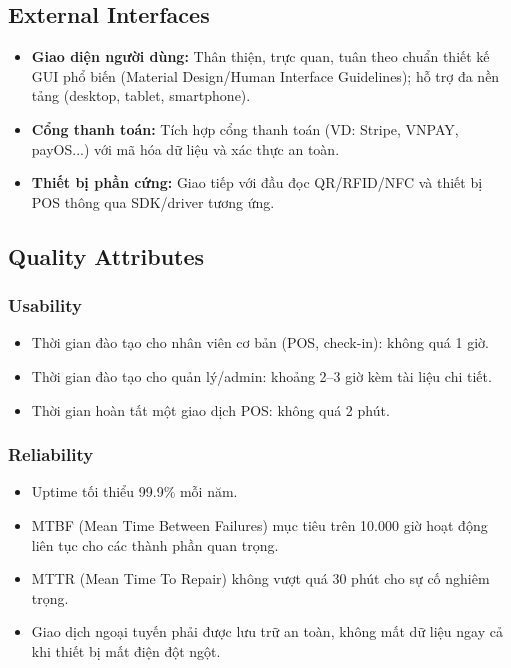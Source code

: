 \subsection{External Interfaces}
\begin{itemize}
    \item \textbf{Giao diện người dùng:} Thân thiện, trực quan, tuân theo
    chuẩn thiết kế GUI phổ biến (Material Design/Human Interface
    Guidelines); hỗ trợ đa nền tảng (desktop, tablet, smartphone).
    \item \textbf{Cổng thanh toán:} Tích hợp cổng thanh toán (VD: Stripe,
    VNPAY, payOS...) với mã hóa dữ liệu và xác thực an toàn.
    \item \textbf{Thiết bị phần cứng:} Giao tiếp với đầu đọc QR/RFID/NFC
    và thiết bị POS thông qua SDK/driver tương ứng.
\end{itemize}

\subsection{Quality Attributes}

\subsubsection{Usability}
\begin{itemize}
    \item Thời gian đào tạo cho nhân viên cơ bản (POS, check-in): không
    quá 1 giờ.
    \item Thời gian đào tạo cho quản lý/admin: khoảng 2--3 giờ kèm tài
    liệu chi tiết.
    \item Thời gian hoàn tất một giao dịch POS: không quá 2 phút.
\end{itemize}

\subsubsection{Reliability}
\begin{itemize}
    \item Uptime tối thiểu 99.9\% mỗi năm.
    \item MTBF (Mean Time Between Failures) mục tiêu trên 10.000 giờ hoạt
    động liên tục cho các thành phần quan trọng.
    \item MTTR (Mean Time To Repair) không vượt quá 30 phút cho sự cố
    nghiêm trọng.
    \item Giao dịch ngoại tuyến phải được lưu trữ an toàn, không mất dữ
    liệu ngay cả khi thiết bị mất điện đột ngột.
\end{itemize}

